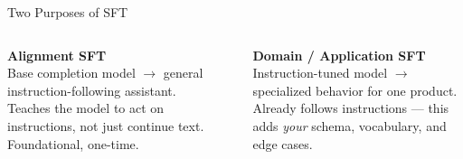 \documentclass[aspectratio=169]{beamer}
\begin{document}
\begin{frame}{Two Purposes of SFT}
  \begin{columns}[t]
      \begin{warmbox}
        \textbf{\color{AtlasWarm}Alignment SFT}\\[2pt]
        Base completion model $\rightarrow$ general instruction-following assistant.\\[4pt]
        {\small\color{NoteGray} Teaches the model to act on instructions, not just continue text. Foundational, one-time.}
      \end{warmbox}
      \begin{coolbox}
        \textbf{\color{AtlasCool}Domain / Application SFT}\\[2pt]
        Instruction-tuned model $\rightarrow$ specialized behavior for one product.\\[4pt]
        {\small\color{NoteGray} Already follows instructions --- this adds \emph{your} schema, vocabulary, and edge cases.\\}
      \end{coolbox}
  \end{columns}
  \vspace{8pt}
\end{frame}
\end{document}
